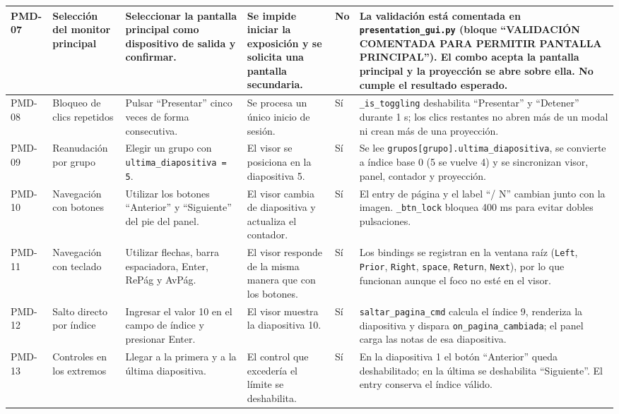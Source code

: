\documentclass[12pt,letterpaper]{article}
\begin{document}
{\begin{longtable}{|L{1.1cm}|L{2.3cm}|L{3.2cm}|L{3.6cm}|L{1.2cm}|L{3.6cm}|}
PMD-07 & Selección del monitor principal & Seleccionar la pantalla principal como dispositivo de salida y confirmar. & Se impide iniciar la exposición y se solicita una pantalla secundaria. & No & La validación está comentada en \texttt{presentation\_gui.py} (bloque ``VALIDACIÓN COMENTADA PARA PERMITIR PANTALLA PRINCIPAL''). El combo acepta la pantalla principal y la proyección se abre sobre ella. No cumple el resultado esperado. \\ \hline
PMD-08 & Bloqueo de clics repetidos & Pulsar ``Presentar'' cinco veces de forma consecutiva. & Se procesa un único inicio de sesión. & Sí & \texttt{\_is\_toggling} deshabilita ``Presentar'' y ``Detener'' durante 1 s; los clics restantes no abren más de un modal ni crean más de una proyección. \\ \hline
PMD-09 & Reanudación por grupo & Elegir un grupo con \texttt{ultima\_diapositiva = 5}. & El visor se posiciona en la diapositiva 5. & Sí & Se lee \texttt{grupos[grupo].ultima\_diapositiva}, se convierte a índice base 0 (5 se vuelve 4) y se sincronizan visor, panel, contador y proyección. \\ \hline
PMD-10 & Navegación con botones & Utilizar los botones ``Anterior'' y ``Siguiente'' del pie del panel. & El visor cambia de diapositiva y actualiza el contador. & Sí & El entry de página y el label ``/ N'' cambian junto con la imagen. \texttt{\_btn\_lock} bloquea 400 ms para evitar dobles pulsaciones. \\ \hline
PMD-11 & Navegación con teclado & Utilizar flechas, barra espaciadora, Enter, RePág y AvPág. & El visor responde de la misma manera que con los botones. & Sí & Los bindings se registran en la ventana raíz (\texttt{Left}, \texttt{Prior}, \texttt{Right}, \texttt{space}, \texttt{Return}, \texttt{Next}), por lo que funcionan aunque el foco no esté en el visor. \\ \hline
PMD-12 & Salto directo por índice & Ingresar el valor 10 en el campo de índice y presionar Enter. & El visor muestra la diapositiva 10. & Sí & \texttt{saltar\_pagina\_cmd} calcula el índice 9, renderiza la diapositiva y dispara \texttt{on\_pagina\_cambiada}; el panel carga las notas de esa diapositiva. \\ \hline
PMD-13 & Controles en los extremos & Llegar a la primera y a la última diapositiva. & El control que excedería el límite se deshabilita. & Sí & En la diapositiva 1 el botón ``Anterior'' queda deshabilitado; en la última se deshabilita ``Siguiente''. El entry conserva el índice válido. \\ \hline

\end{longtable}}
\end{document}
